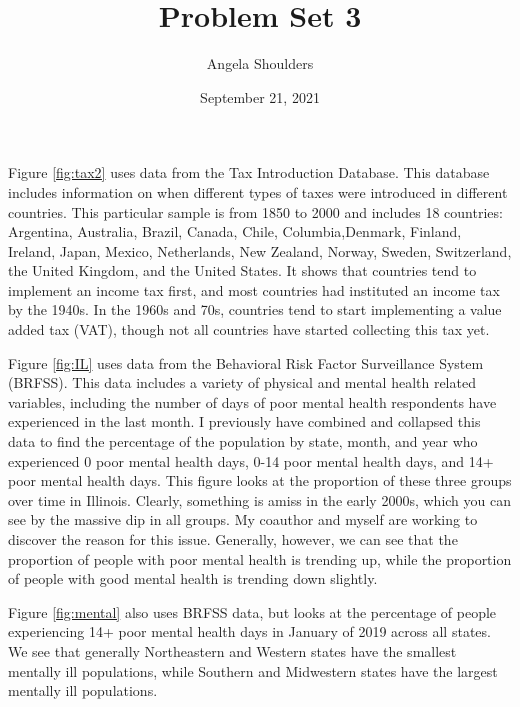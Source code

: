 \documentclass{article}[12pt]
\begin{document}
\title{Problem Set 3}
\author{Angela Shoulders}
\date{September 21, 2021}

\maketitle

Figure \ref{fig:tax2} uses data from the Tax Introduction Database.
This database includes information on when different types of taxes
were introduced in different countries.  This particular sample is
from 1850 to 2000 and includes 18 countries: Argentina, Australia,
Brazil, Canada, Chile, Columbia,Denmark, Finland, Ireland, Japan,
Mexico, Netherlands, New Zealand, Norway, Sweden, Switzerland,
the United Kingdom, and the United States.  It shows that countries
tend to implement an income tax first, and most countries had instituted
an income tax by the 1940s.  In the 1960s and 70s, countries tend
to start implementing a value added tax (VAT), though not all countries
have started collecting this tax yet.

Figure \ref{fig:IL} uses data from the Behavioral Risk Factor Surveillance
System (BRFSS).  This data includes a variety of physical and mental
health related variables, including the number of days of poor mental
health respondents have experienced in the last month.  I previously
have combined and collapsed this data to find the percentage of the
population by state, month, and year who experienced 0 poor mental
health days, 0-14 poor mental health days, and 14+ poor mental health
days.  This figure looks at the proportion of these three groups over
time in Illinois.  Clearly, something is amiss in the early 2000s,
which you can see by the massive dip in all groups.  My coauthor and
myself are working to discover the reason for this issue.  Generally,
however, we can see that the proportion of people with poor mental health
is trending up, while the proportion of people with good mental health
is trending down slightly.

Figure \ref{fig:mental} also uses BRFSS data, but looks at the percentage
of people experiencing 14+ poor mental health days in January of 2019
across all states.  We see that generally Northeastern and Western states
have the smallest mentally ill populations, while Southern and Midwestern
states have the largest mentally ill populations.
\end{document}
